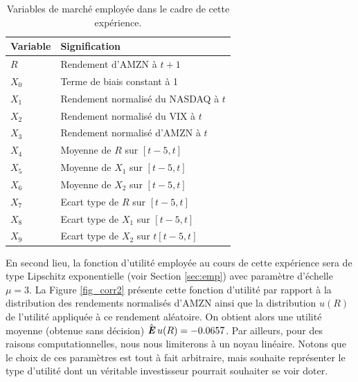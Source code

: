 \begin{table}[h]
  \centering
\begin{tabular}{ll}
  \toprule
  Variable  & Signification\\
  \midrule
  $R$ & Rendement d'AMZN à $t+1$\\
  $X_0$ & Terme de biais constant à 1\\
  $X_1$ & Rendement normalisé du NASDAQ à $t$\\
  $X_2$ & Rendement normalisé du VIX à $t$\\
  $X_3$ & Rendement normalisé d'AMZN à $t$\\
  $X_4$ & Moyenne de $R$ sur $[t-5,t]$\\
  $X_5$ & Moyenne de $X_1$ sur $[t-5,t]$\\
  $X_6$ & Moyenne de $X_2$ sur $[t-5,t]$\\
  $X_7$ & Ecart type de $R$ sur $[t-5,t]$\\
  $X_8$ & Ecart type de $X_1$ sur $[t-5,t]$\\
  $X_9$ & Ecart type de $X_2$ sur $t[t-5,t]$\\
  \bottomrule
\end{tabular}
\caption{Variables de marché employée dans le cadre de cette expérience.}
\label{table_corr}
\end{table}

En second lieu, la fonction d'utilité employée au cours de cette expérience sera de type
Lipschitz exponentielle (voir Section \ref{sec:emp}) avec paramètre d'échelle $\mu = 3$. La
Figure \ref{fig_corr2} présente cette fonction d'utilité par rapport à la distribution des
rendements normalisés d'AMZN ainsi que la distribution $u(R)$ de l'utilité appliquée à ce
rendement aléatoire. On obtient alors une utilité moyenne (obtenue sans décision)
$\operatorname{\hat{\operatorname{\mbox{\textbf{\textit{E}}}}}} u(R)=\num{-0.0657}$. Par ailleurs, pour des raisons computationnelles, nous nous
limiterons à un noyau linéaire. Notons que le choix de ces paramètres est tout à fait
arbitraire, mais souhaite représenter le type d'utilité dont un véritable investisseur
pourrait souhaiter se voir doter.

